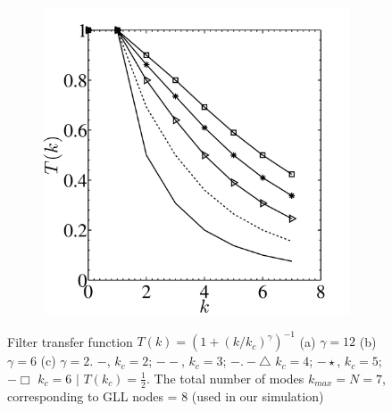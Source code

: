 \begin{figure}
\begin{subfigure}[b]{0.32\textwidth}
                 \caption{}
                 \label{fig:filt2}
         \end{subfigure}%
         \begin{subfigure}[b]{0.32\textwidth}
         \centering
                \includegraphics[width=\linewidth]{Figure/filter3.pdf}
                 \caption{}
                 \label{fig:filt3}
         \end{subfigure}
        \caption[Filter transfer function for different $(k_c, \ \gamma)$: Near Wall Modelling]{Filter transfer function ${T}(k) = (1 + (k/k_{c})^\gamma)^{-1}$ (a) $\gamma = 12$ (b) $\gamma = 6$ (c) $\gamma = 2$.\hspace{2mm} $-$, $k_c = 2$; $--$, $k_c = 3$; $-.- \triangle$ $k_c = 4$; $-\star$, $k_c = 5$; $- \Box$ $k_c = 6$ $|$ ${T}(k_c) = \frac{1}{2}$. The total number of modes $k_{max} = N =7$, corresponding to GLL nodes = 8 (used in our simulation)}\label{fig:elem_filter}
\end{figure}

